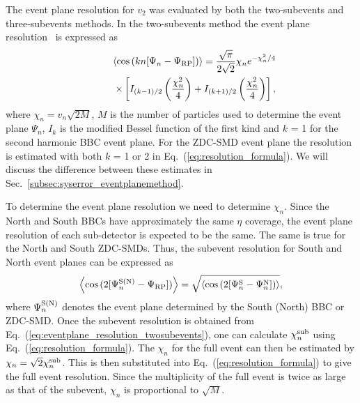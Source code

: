 \documentclass[aps,prc,superscriptaddress,showpacs,floatfix,twocolumn]{revtex4}
\newcommand \RP{\mbox{$\Psi_{\rm{RP}}$}\xspace}
\begin{document}
The event plane resolution  for $v_2$ was evaluated by both the two-subevents and three-subevents methods. 
In the two-subevents method the event plane resolution~\cite{Poskanzer:1998yz} is expressed as
\begin{eqnarray}
& & \left<\cos{(kn[\Psi_n - \RP])}\right> 
= \frac{\sqrt{\pi}}{2\sqrt{2}}\chi_n e^{-\chi_n^2/4} \nonumber \\
& & \qquad \times \left[ I_{(k-1)/2}\left(\frac{\chi_n^2}{4}\right) + I_{(k+1)/2}\left(\frac{\chi_n^2}{4}\right) \right], 
\label{eq:resolution_formula}
\end{eqnarray}
where $\chi_n = v_n\sqrt{2M}$, $M$ is the number of particles used to determine the event 
plane $\Psi_n$, $I_k$ is the modified Bessel function of the first kind and $k$ = 1 for the 
second harmonic BBC event plane. For the ZDC-SMD event plane the resolution is estimated with 
both $k$ = 1 or 2 in Eq.~(\ref{eq:resolution_formula}). We will discuss the difference between 
these estimates in Sec.~\ref{subsec:syserror_eventplanemethod}.

To determine the event plane resolution we need to determine $\chi_n$. Since the North and 
South BBCs have approximately the same $\eta$ coverage, the event plane resolution of each 
sub-detector is expected to be the same. The same is true for the North and South ZDC-SMDs.
Thus, the subevent resolution for South and North event planes can be expressed as
\begin{eqnarray}
\left<\cos{(2[\Psi_n^{\rm S(N)} - \RP])}\right>
 = \sqrt{ \left<\cos{(2[\Psi_n^{\rm S} - \Psi_n^{\rm N}])}\right> },
 \label{eq:eventplane_resolution_twosubevents}
\end{eqnarray}
where $\Psi_n^{\rm S(N)}$ denotes the event plane determined by the South (North) BBC or ZDC-SMD. 
Once the subevent resolution is obtained from Eq.~(\ref{eq:eventplane_resolution_twosubevents}), 
one can calculate $\chi_n^{\rm sub}$ using Eq.~(\ref{eq:resolution_formula}). The $\chi_n$ for the 
full event can then be estimated by $\chi_n = \sqrt{2}\chi_n^{\rm sub}$. This is then substituted 
into Eq.~(\ref{eq:resolution_formula}) to give the full event resolution. Since the multiplicity 
of the full event is twice as large as that of the subevent, $\chi_n$ is proportional to $\sqrt{M}$.
\end{document}
